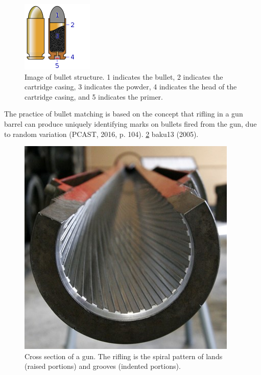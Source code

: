 \documentclass[print]{nuthesis}
\begin{document}
\begin{figure}

{\centering \includegraphics[width=0.5\linewidth]{images/Cartridge_cross_section} 

}

\caption{Image of bullet structure. 1 indicates the bullet, 2 indicates the cartridge casing, 3 indicates the powder, 4 indicates the head of the cartridge casing, and 5 indicates the primer.}\label{fig:structure}
\end{figure}

The practice of bullet matching is based on the concept that rifling in a gun barrel can produce uniquely identifying marks on bullets fired from the gun, due to random variation (PCAST, 2016, p. 104).
 \ref{fig:rifling}  baku13 (2005).

\begin{figure}

{\centering \includegraphics[width=0.5\linewidth]{images/rifling} 

}

\caption{Cross section of a gun. The rifling is the spiral pattern of lands (raised portions) and grooves (indented portions).}\label{fig:rifling}
\end{figure}
\end{document}
